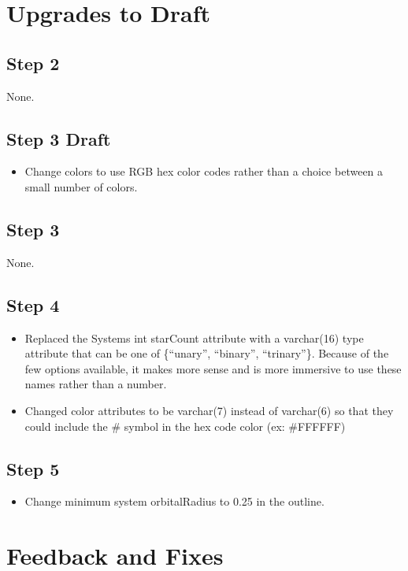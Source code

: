 \documentclass[12pt]{article}
\begin{document}
\newpage

\begin{appendices}
\section{Upgrades to Draft}

\subsection{Step 2}
None.

\subsection{Step 3 Draft}
\begin{itemize}
    \item Change colors to use RGB hex color codes rather than a choice between a small number of colors.
\end{itemize}

\subsection{Step 3}
None.

\subsection{Step 4}
\begin{itemize}
    \item Replaced the Systems int starCount attribute with a varchar(16) type attribute that can be one of \{“unary”, “binary”, “trinary”\}. Because of the few options available, it makes more sense and is more immersive to use these names rather than a number.
    \item Changed color attributes to be varchar(7) instead of varchar(6) so that they could include the \# symbol in the hex code color (ex: \#FFFFFF)
\end{itemize}

\subsection{Step 5}
\begin{itemize}
    \item Change minimum system orbitalRadius to 0.25 in the outline.
\end{itemize}

\newpage
\section{Feedback and Fixes}


\end{appendices}
\end{document}
